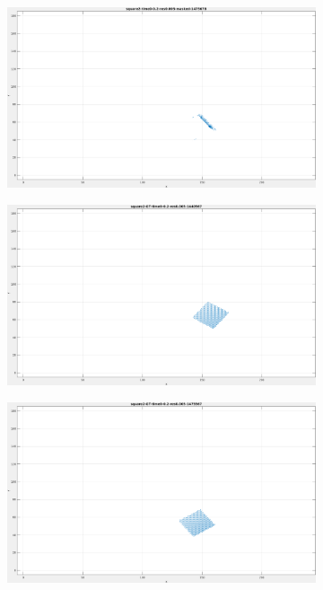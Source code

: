 \begin{appendix}
\begin{figure}[tb]
\begin{subfigure}{.45\textwidth}
  \caption{}
\end{subfigure}
\begin{subfigure}{.45\textwidth}
  \centering
  \includegraphics[height=.6\linewidth]{figs/square2/square2-masked-2.png}
  \caption{}
\end{subfigure}
\begin{subfigure}{.45\textwidth}
  \centering
  \includegraphics[height=.6\linewidth]{figs/square2/square2-GT-1.png}
  \caption{}
\end{subfigure}
\begin{subfigure}{.45\textwidth}
  \centering
  \includegraphics[height=.6\linewidth]{figs/square2/square2-GT-2.png}

\end{subfigure}
\end{figure}
\end{appendix}
